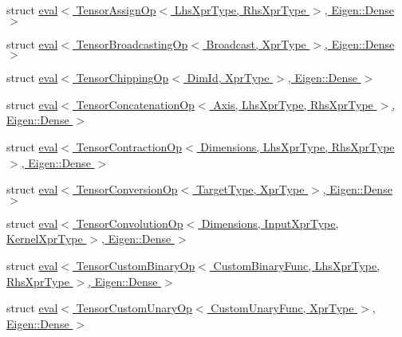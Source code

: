 \begin{DoxyCompactItemize}
\item 
struct \hyperlink{struct_eigen_1_1internal_1_1eval_3_01_tensor_assign_op_3_01_lhs_xpr_type_00_01_rhs_xpr_type_01_4_00_01_eigen_1_1_dense_01_4}{eval$<$ Tensor\+Assign\+Op$<$ Lhs\+Xpr\+Type, Rhs\+Xpr\+Type $>$, Eigen\+::\+Dense $>$}
\item 
struct \hyperlink{struct_eigen_1_1internal_1_1eval_3_01_tensor_broadcasting_op_3_01_broadcast_00_01_xpr_type_01_4_00_01_eigen_1_1_dense_01_4}{eval$<$ Tensor\+Broadcasting\+Op$<$ Broadcast, Xpr\+Type $>$, Eigen\+::\+Dense $>$}
\item 
struct \hyperlink{struct_eigen_1_1internal_1_1eval_3_01_tensor_chipping_op_3_01_dim_id_00_01_xpr_type_01_4_00_01_eigen_1_1_dense_01_4}{eval$<$ Tensor\+Chipping\+Op$<$ Dim\+Id, Xpr\+Type $>$, Eigen\+::\+Dense $>$}
\item 
struct \hyperlink{struct_eigen_1_1internal_1_1eval_3_01_tensor_concatenation_op_3_01_axis_00_01_lhs_xpr_type_00_014584aefce4bd43d98989ef5eac495878}{eval$<$ Tensor\+Concatenation\+Op$<$ Axis, Lhs\+Xpr\+Type, Rhs\+Xpr\+Type $>$, Eigen\+::\+Dense $>$}
\item 
struct \hyperlink{struct_eigen_1_1internal_1_1eval_3_01_tensor_contraction_op_3_01_dimensions_00_01_lhs_xpr_type_0ae5a9acfb75ebc4b7f37699317bff474}{eval$<$ Tensor\+Contraction\+Op$<$ Dimensions, Lhs\+Xpr\+Type, Rhs\+Xpr\+Type $>$, Eigen\+::\+Dense $>$}
\item 
struct \hyperlink{struct_eigen_1_1internal_1_1eval_3_01_tensor_conversion_op_3_01_target_type_00_01_xpr_type_01_4_00_01_eigen_1_1_dense_01_4}{eval$<$ Tensor\+Conversion\+Op$<$ Target\+Type, Xpr\+Type $>$, Eigen\+::\+Dense $>$}
\item 
struct \hyperlink{struct_eigen_1_1internal_1_1eval_3_01_tensor_convolution_op_3_01_dimensions_00_01_input_xpr_type57757a1b6151765c50323fde8ef0519e}{eval$<$ Tensor\+Convolution\+Op$<$ Dimensions, Input\+Xpr\+Type, Kernel\+Xpr\+Type $>$, Eigen\+::\+Dense $>$}
\item 
struct \hyperlink{struct_eigen_1_1internal_1_1eval_3_01_tensor_custom_binary_op_3_01_custom_binary_func_00_01_lhs_0b3fac7023a8693ad10b9b9dcfd17f7c}{eval$<$ Tensor\+Custom\+Binary\+Op$<$ Custom\+Binary\+Func, Lhs\+Xpr\+Type, Rhs\+Xpr\+Type $>$, Eigen\+::\+Dense $>$}
\item 
struct \hyperlink{struct_eigen_1_1internal_1_1eval_3_01_tensor_custom_unary_op_3_01_custom_unary_func_00_01_xpr_ty453212bf40fc24f334a0deb6823dd342}{eval$<$ Tensor\+Custom\+Unary\+Op$<$ Custom\+Unary\+Func, Xpr\+Type $>$, Eigen\+::\+Dense $>$}
\item 

\end{DoxyCompactItemize}
